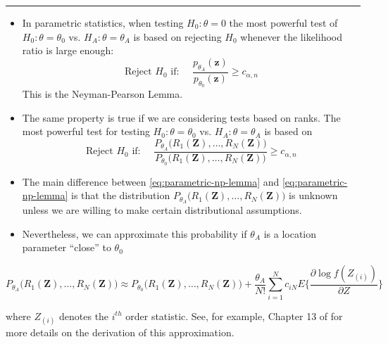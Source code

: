 \documentclass[]{book}
\begin{document}
\begin{center}\rule{0.5\linewidth}{\linethickness}\end{center}

\begin{itemize}
\item
  In parametric statistics, when testing \(H_{0}:\theta = 0\) the most powerful test
  of \(H_{0}: \theta = \theta_{0}\) vs. \(H_{A}:\theta = \theta_{A}\) is based on
  rejecting \(H_{0}\) whenever the likelihood ratio is large enough:
  \begin{equation}
  \textrm{Reject } H_{0} \textrm{ if: } \quad \frac{p_{\theta_{A}}(\mathbf{z})}{p_{\theta_{0}}(\mathbf{z})} \geq c_{\alpha, n}
  \label{eq:parametric-np-lemma}
  \end{equation}
  This is the Neyman-Pearson Lemma.
\item
  The same property is true if we are considering tests based on ranks. The most powerful test
  for testing \(H_{0}: \theta = \theta_{0}\) vs. \(H_{A}:\theta = \theta_{A}\) is based on
  \begin{equation}
  \textrm{Reject } H_{0} \textrm{ if: } \quad 
  \frac{P_{\theta_{A}}\Big( R_{1}(\mathbf{Z}), \ldots, R_{N}(\mathbf{Z}) \Big)}{ P_{\theta_{0}}\Big( R_{1}(\mathbf{Z}), \ldots, R_{N}(\mathbf{Z}) \Big) } \geq c_{\alpha, n}
  \label{eq:nonparametric-np-lemma}
  \end{equation}
\item
  The main difference between \eqref{eq:parametric-np-lemma} and \eqref{eq:parametric-np-lemma} is
  that the distribution \(P_{\theta_{A}}\Big( R_{1}(\mathbf{Z}), \ldots, R_{N}(\mathbf{Z}) \Big)\)
  is unknown unless we are willing to make certain distributional assumptions.
\item
  Nevertheless, we can approximate this probability if \(\theta_{A}\) is a location parameter ``close'' to \(\theta_{0}\)
\end{itemize}

\begin{equation}
P_{\theta_{A}}\Big( R_{1}(\mathbf{Z}), \ldots, R_{N}(\mathbf{Z}) \Big)
\approx P_{\theta_{0}}\Big( R_{1}(\mathbf{Z}), \ldots, R_{N}(\mathbf{Z}) \Big)
+ \frac{\theta_{A}}{N!}\sum_{i=1}^{N} c_{iN} E\Bigg\{ \frac{\partial \log f(Z_{(i)})}{ \partial Z}  \Bigg\}
\end{equation}

where \(Z_{(i)}\) denotes the \(i^{th}\) order statistic.
See, for example, Chapter 13 of \citet{van2000} for more details on the derivation of this approximation.
\end{document}
